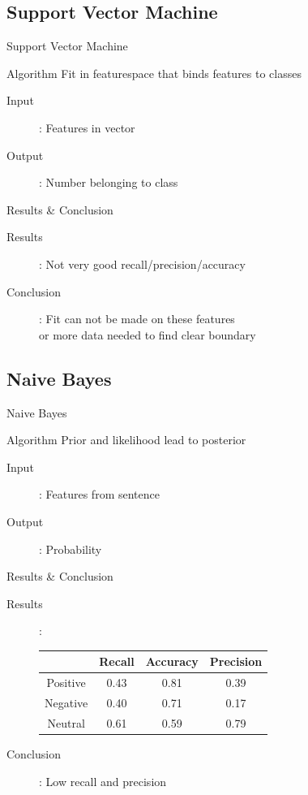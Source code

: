 \documentclass{beamer}
\begin{document}
\subsection{Support Vector Machine}
\begin{frame}{Support Vector Machine}
\begin{block}{Algorithm}
Fit in featurespace that binds features to classes
\end{block}
\begin{description}
\item[Input]: Features in vector
\item[Output]: Number belonging to class
\end{description}
\end{frame}
\begin{frame}{Results \& Conclusion}
\begin{description}
\item[Results]: Not very good recall/precision/accuracy
\item[Conclusion]: Fit can not be made on these features\\ or more data needed to find clear boundary 
\end{description}
\end{frame}

\subsection{Naive Bayes}
\begin{frame}{Naive Bayes}
\begin{block}{Algorithm}
Prior and likelihood lead to posterior
\end{block}
\begin{description}
\item[Input]: Features from sentence
\item[Output]: Probability
\end{description}
\end{frame}
\begin{frame}{Results \& Conclusion}
\begin{description}
\item[Results]:
\begin{tabular}{c || c | c | c}\\
 & Recall & Accuracy & Precision \\
\hline
Positive & 0.43 & 0.81 & 0.39\\
Negative & 0.40 & 0.71 & 0.17 \\
Neutral & 0.61 & 0.59 & 0.79 \\
\end{tabular}
\item[Conclusion]: Low recall and precision
\end{description}
\end{frame}
\end{document}
